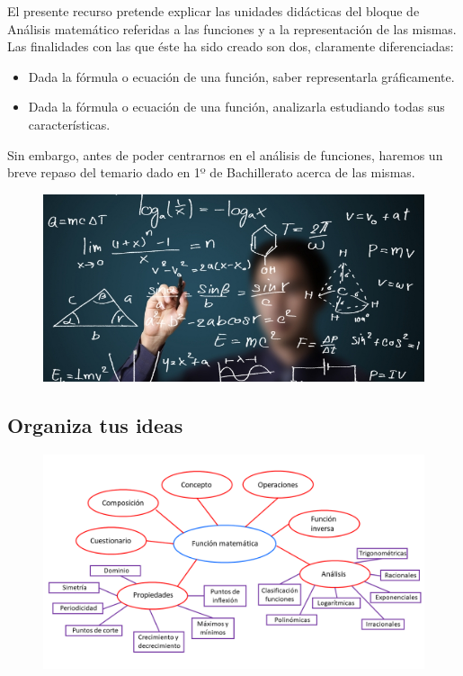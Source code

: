 

El presente recurso pretende explicar las unidades didácticas del bloque de Análisis matemático referidas a las funciones y a la representación de las mismas. Las finalidades con las que éste ha sido creado son dos, claramente diferenciadas:
\begin{itemize}
	\item Dada la fórmula o ecuación de una función, saber representarla gráficamente.
	\item Dada la fórmula o ecuación de una función, analizarla estudiando todas sus características.
\end{itemize}
Sin embargo, antes de poder centrarnos en el análisis de funciones, haremos un breve repaso del temario dado en 1º de Bachillerato acerca de las mismas.\\
\begin{figure}
	\includegraphics{samples/introduccion_imagen.jpg}
	\centering
\end{figure}
 
\subsection{Organiza tus ideas}
\begin{figure}
	\includegraphics[width=20cm]{samples/ideas.png}
	\centering
\end{figure}